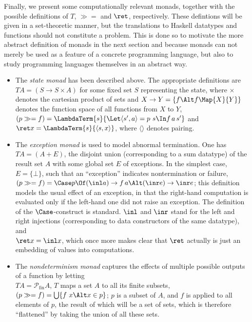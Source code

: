Finally, we present some computationally relevant monads, together with the
possible definitions of $T$, $\gg=$ and $\ret$, respectively. These defintions
will be given in a set-theoretic manner, but the translations to Haskell
datatypes and functions should not constitute a problem. This is done so to
motivate the more abstract definition of monads in the next section and because
monads can not merely be used as a feature of a concrete programming language,
but also to study programming languages themselves in an abstract way.
\begin{itemize}
\item The \emph{state monad} has been described above. The appropriate
  definitions are\\
  $T A = (S \to S \times A)$ for some fixed set $S$ representing the state, where $\times$
  denotes the cartesian product of sets and $X \to Y = \{f\Alt f \Map{X}{Y}\}$
  denotes the function space of all functions from $X$ to $Y$,\\
  $(p \gg= f) = \LambdaTerm{s}{\Let \langle s', a\rangle = p\ s \In f\,a\,s'}$ and\\
  $\ret x = \LambdaTerm{s}{\langle s, x\rangle}$, where $\langle\rangle$ denotes pairing.

\item The \emph{exception monad} is used to model abnormal termination. One
  has\\
  $T A = (A + E)$, \IE the disjoint union (corresponding to a sum datatype) of
  the result set $A$ with some global set $E$ of exceptions. In the simplest
  case, $E = \{\bot\}$, such that an ``exception''
  indicates nontermination or failure,\\
  $(p \gg= f) = \Case p \Of (\inl a) \to f\,a \Alt (\inr e) \to \inr e$; this
  definition models the usual effect of an exception, in that the right-hand
  computation is evaluated only if the left-hand one did not raise an
  exception. The definition of the $\Case$-construct is standard. $\inl$ and
  $\inr$ stand for the left and right injections (corresponding to data
  constructors of the same datatype), and\\
  $\ret x = \inl x$, which once more makes clear that $\ret$ actually is just an
  embedding of values into computations.

\item The \emph{nondeterminism monad} captures the effects of multiple possible
  outputs of a function by letting\\
  $T A = \mathcal{P}_{\mathrm{fin}} A$, \IE $T$ maps a set $A$ to all its finite
  subsets,\\
  $(p \gg= f) = \bigcup\{f\ x \Alt x \in p\}$; $p$ is a subset of $A$, and $f$ is applied to
  all elements of $p$, the result of which will be a set of sets, which is
  therefore ``flattened'' by taking the union of all these sets.


\end{itemize}
